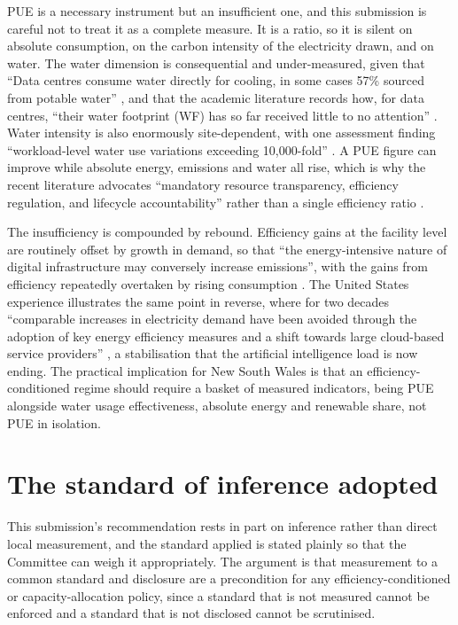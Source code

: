 PUE is a necessary instrument but an insufficient one, and this submission is careful not to treat it as a complete measure. It is a ratio, so it is silent on absolute consumption, on the carbon intensity of the electricity drawn, and on water. The water dimension is consequential and under-measured, given that \enquote{Data centres consume water directly for cooling, in some cases 57\% sourced from potable water} \autocite{myttonDataCentreWater2021}, and that the academic literature records how, for data centres, \enquote{their water footprint (WF) has so far received little to no attention} \autocite{risticWaterFootprintData2015}. Water intensity is also enormously site-dependent, with one assessment finding \enquote{workload-level water use variations exceeding 10,000-fold} \autocite{leiWaterUseData2025}. A PUE figure can improve while absolute energy, emissions and water all rise, which is why the recent literature advocates \enquote{mandatory resource transparency, efficiency regulation, and lifecycle accountability} rather than a single efficiency ratio \autocite{imanHiddenCostsIntelligence2025}.

The insufficiency is compounded by rebound. Efficiency gains at the facility level are routinely offset by growth in demand, so that \enquote{the energy-intensive nature of digital infrastructure may conversely increase emissions}, with the gains from efficiency repeatedly overtaken by rising consumption \autocite{liuImpactGlobalDigital2025}. The United States experience illustrates the same point in reverse, where for two decades \enquote{comparable increases in electricity demand have been avoided through the adoption of key energy efficiency measures and a shift towards large cloud-based service providers} \autocite{shehabiDataCenterGrowth2018a}, a stabilisation that the artificial intelligence load is now ending. The practical implication for New South Wales is that an efficiency-conditioned regime should require a basket of measured indicators, being PUE alongside water usage effectiveness, absolute energy and renewable share, not PUE in isolation.

\section{The standard of inference adopted}
\label{sec:sq1:inference}

This submission's recommendation rests in part on inference rather than direct local measurement, and the standard applied is stated plainly so that the Committee can weigh it appropriately. The argument is that measurement to a common standard and disclosure are a precondition for any efficiency-conditioned or capacity-allocation policy, since a standard that is not measured cannot be enforced and a standard that is not disclosed cannot be scrutinised.
